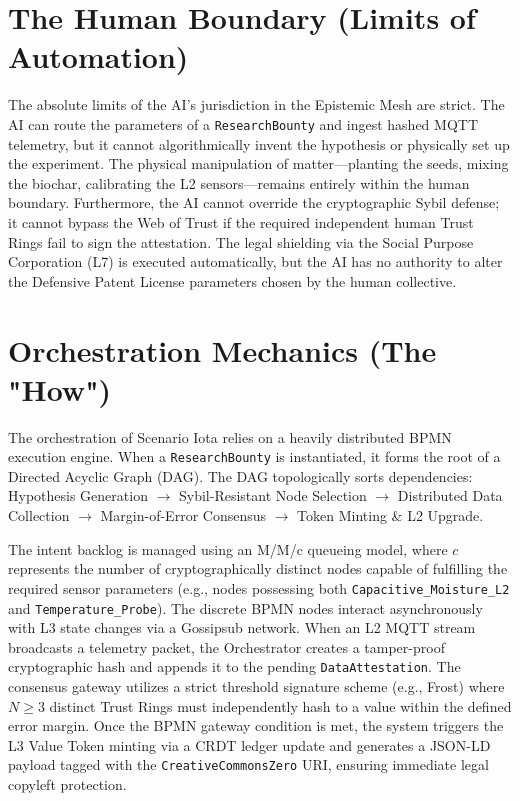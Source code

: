 \section{The Human Boundary (Limits of Automation)}
The absolute limits of the AI's jurisdiction in the Epistemic Mesh are strict. The AI can route the parameters of a \texttt{ResearchBounty} and ingest hashed MQTT telemetry, but it cannot algorithmically invent the hypothesis or physically set up the experiment. The physical manipulation of matter---planting the seeds, mixing the biochar, calibrating the L2 sensors---remains entirely within the human boundary. Furthermore, the AI cannot override the cryptographic Sybil defense; it cannot bypass the Web of Trust if the required independent human Trust Rings fail to sign the attestation. The legal shielding via the Social Purpose Corporation (L7) is executed automatically, but the AI has no authority to alter the Defensive Patent License parameters chosen by the human collective.

\section{Orchestration Mechanics (The "How")}
The orchestration of Scenario Iota relies on a heavily distributed BPMN execution engine. When a \texttt{ResearchBounty} is instantiated, it forms the root of a Directed Acyclic Graph (DAG). The DAG topologically sorts dependencies: Hypothesis Generation $\rightarrow$ Sybil-Resistant Node Selection $\rightarrow$ Distributed Data Collection $\rightarrow$ Margin-of-Error Consensus $\rightarrow$ Token Minting \& L2 Upgrade. 

The intent backlog is managed using an M/M/c queueing model, where $c$ represents the number of cryptographically distinct nodes capable of fulfilling the required sensor parameters (e.g., nodes possessing both \texttt{Capacitive\_Moisture\_L2} and \texttt{Temperature\_Probe}). The discrete BPMN nodes interact asynchronously with L3 state changes via a Gossipsub network. When an L2 MQTT stream broadcasts a telemetry packet, the Orchestrator creates a tamper-proof cryptographic hash and appends it to the pending \texttt{DataAttestation}. The consensus gateway utilizes a strict threshold signature scheme (e.g., Frost) where $N \ge 3$ distinct Trust Rings must independently hash to a value within the defined error margin. Once the BPMN gateway condition is met, the system triggers the L3 Value Token minting via a CRDT ledger update and generates a JSON-LD payload tagged with the \texttt{CreativeCommonsZero} URI, ensuring immediate legal copyleft protection.
